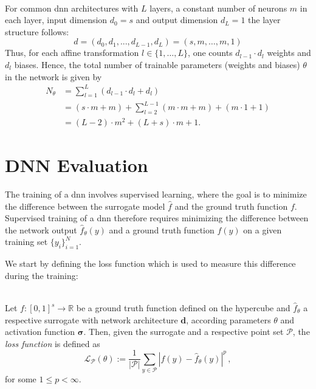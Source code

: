\begin{remark} \ \\
    For common \ac{dnn} architectures with $L$ layers, a constant number of
    neurons $m$ in each layer, input dimension $d_0=s$ and output dimension
    $d_L=1$ the layer structure follows:
    \begin{equation*}
        d=(d_0,d_1,...,d_{L-1},d_L) = (s,m,\dots,m,1)
    \end{equation*}
    Thus, for each affine transformation $l\in\{1,\dots,L\}$, one counts $d_{l-1}
    \cdot d_l$ weights and $d_l$ biases. Hence, the total number of trainable
    parameters (weights and biases) $\theta$ in the network is given by
    \begin{align*}
        N_\theta &= \sum_{l=1}^{L} (d_{l-1} \cdot d_l + d_l) \\
        &= (s \cdot m + m) + \sum_{l=2}^{L-1} (m \cdot m + m) + (m \cdot 1 + 1) \\
        &= (L-2) \cdot m^2 + (L+s) \cdot m + 1.
    \end{align*}
\end{remark}

\section{DNN Evaluation}
\label{sec:dnn-error}

The training of a \ac{dnn} involves supervised learning, where the goal is to
minimize the difference between the surrogate model $\hat{f}$ and the ground
truth function $f$. Supervised training of a \ac{dnn} therefore requires
minimizing the difference between the network output $\hat{f}_\theta(y)$ and a
ground truth function $f(y)$ on a given training set $\{y_i\}_{i=1}^N$.

We start by defining the loss function which is used to measure this difference
during the training:

\begin{definition} \ \\
Let $f:[0,1]^s\to\mathbb{R}$ be a ground truth function defined on the hypercube
and $\hat{f}_\theta$ a respective surrogate with network architecture
$\mathbf{d}$, according parameters $\theta$ and activation function
$\boldsymbol{\sigma}$. Then, given the surrogate and a respective point set
$\mathcal{P}$, the \emph{loss function} is defined as
\begin{equation}
\mathcal{L}_{\mathcal{P}}(\theta) := \frac{1}{|\mathcal{P}|}\sum\limits_{y \in \mathcal{P}} |f(y) - \hat{f}_\theta(y)|^p\,,
\label{eq:loss_function}
\end{equation}
for some $1\leq p < \infty$.
\end{definition}

